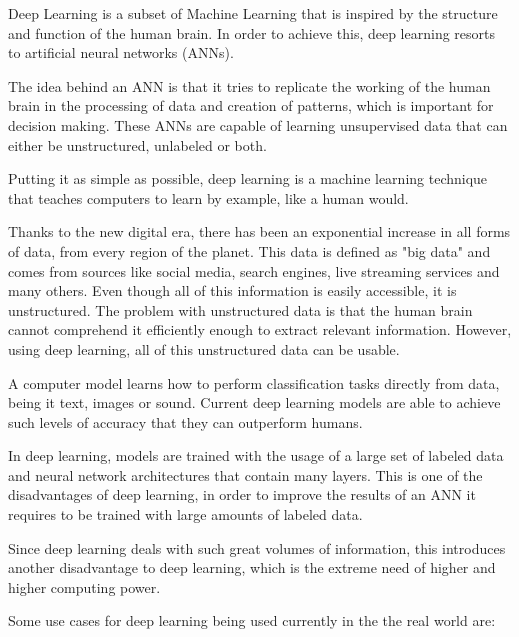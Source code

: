     \par Deep Learning is a subset of Machine Learning that is inspired by the structure and function of the human brain. In order to achieve this, deep learning resorts to artificial neural networks (ANNs).
    
    \par The idea behind an ANN is that it tries to replicate the working of the human brain in the processing of data and creation of patterns, which is important for decision making. These ANNs are capable of learning unsupervised data that can either be unstructured, unlabeled or both. 
    
    \par Putting it as simple as possible, deep learning is a machine learning technique that teaches computers to learn by example, like a human would. \cite{mathworks_deeplearning}


    \par Thanks to the new digital era, there has been an exponential increase in all forms of data, from every region of the planet. This data is defined as "big data" and comes from sources like social media, search engines, live streaming services and many others. Even though all of this information is easily accessible, it is unstructured. The problem with unstructured data is that the human brain cannot comprehend it efficiently enough to extract relevant information. However, using deep learning, all of this unstructured data can be usable.

    \par A computer model learns how to perform classification tasks directly from data, being it text, images or sound. Current deep learning models are able to achieve such levels of accuracy that they can outperform humans.

    \par In deep learning, models are trained with the usage of a large set of labeled data and neural network architectures that contain many layers. This is one of the disadvantages of deep learning, in order to improve the results of an ANN it requires to be trained with large amounts of labeled data.

    \par Since deep learning deals with such great volumes of information, this introduces another disadvantage to deep learning, which is the extreme need of higher and higher computing power.

    \par Some use cases for deep learning being used currently in the the real world are:  \cite{mathworks_deeplearning}

